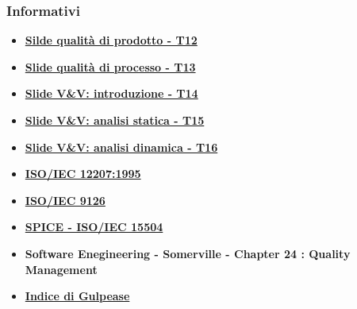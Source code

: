 \subsubsection{Informativi}
\begin{itemize}
    \item \href{https://www.math.unipd.it/~tullio/IS-1/2021/Dispense/T12.pdf}{\textbf{Silde qualità di prodotto - T12}}
    \item \href{https://www.math.unipd.it/~tullio/IS-1/2021/Dispense/T13.pdf}{\textbf{Slide qualità di processo - T13}}
    \item \href{https://www.math.unipd.it/~tullio/IS-1/2021/Dispense/T14.pdf}{\textbf{Slide V\&V: introduzione - T14}}
    \item \href{https://www.math.unipd.it/~tullio/IS-1/2021/Dispense/T15.pdf}{\textbf{Slide V\&V: analisi statica - T15}}
    \item \href{https://www.math.unipd.it/~tullio/IS-1/2021/Dispense/T16.pdf}{\textbf{Slide V\&V: analisi dinamica - T16}}
    \item \href{https://www.math.unipd.it/~tullio/IS-1/2009/Approfondimenti/ISO_12207-1995.pdf}{\textbf{ISO/IEC 12207:1995}}
    \item \href{https://it.wikipedia.org/wiki/ISO/IEC_9126}{\textbf{ISO/IEC 9126}}
    \item \href{https://en.wikipedia.org/wiki/ISO/IEC_15504}{\textbf{SPICE - ISO/IEC 15504}}
    \item \textbf{Software Enegineering - Somerville - Chapter 24 : Quality Management}
    \item \href{https://it.wikipedia.org/wiki/Indice_Gulpease}{\textbf{Indice di Gulpease}}
\end{itemize}
